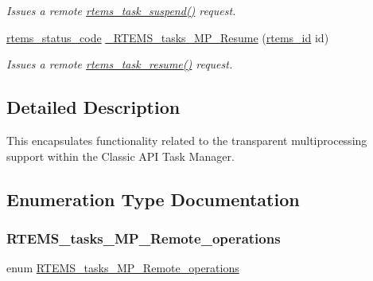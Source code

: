 \begin{DoxyCompactItemize}
\begin{DoxyCompactList}\small\item\em Issues a remote \mbox{\hyperlink{group__ClassicTasks_ga16aca2f5aa37d9d2b2a1a54de0f63dbf}{rtems\+\_\+task\+\_\+suspend()}} request. \end{DoxyCompactList}\item 
\mbox{\label{group__ClassicTaskMP_gab5bcf94fbad75d03234baa47272bdd31}} 
\mbox{\hyperlink{group__ClassicStatus_ga545d41846817eaba6143d52ee4d9e9fe}{rtems\+\_\+status\+\_\+code}} \mbox{\hyperlink{group__ClassicTaskMP_gab5bcf94fbad75d03234baa47272bdd31}{\+\_\+\+R\+T\+E\+M\+S\+\_\+tasks\+\_\+\+M\+P\+\_\+\+Resume}} (\mbox{\hyperlink{group__ClassicTasks_gab20892b814dced7dd4e5b9bf42becd57}{rtems\+\_\+id}} id)
\begin{DoxyCompactList}\small\item\em Issues a remote \mbox{\hyperlink{group__ClassicTasks_ga5b5778a2be36d41764e730377ccc58a5}{rtems\+\_\+task\+\_\+resume()}} request. \end{DoxyCompactList}\end{DoxyCompactItemize}


\subsection{Detailed Description}
This encapsulates functionality related to the transparent multiprocessing support within the Classic A\+PI Task Manager. 

\subsection{Enumeration Type Documentation}
\mbox{\label{group__ClassicTaskMP_ga8898253dbfcff93eb97b8646eefd1fa3}} 
\subsubsection{\texorpdfstring{RTEMS\_tasks\_MP\_Remote\_operations}{RTEMS\_tasks\_MP\_Remote\_operations}}
{\footnotesize\ttfamily enum \mbox{\hyperlink{group__ClassicTaskMP_ga8898253dbfcff93eb97b8646eefd1fa3}{R\+T\+E\+M\+S\+\_\+tasks\+\_\+\+M\+P\+\_\+\+Remote\+\_\+operations}}}

